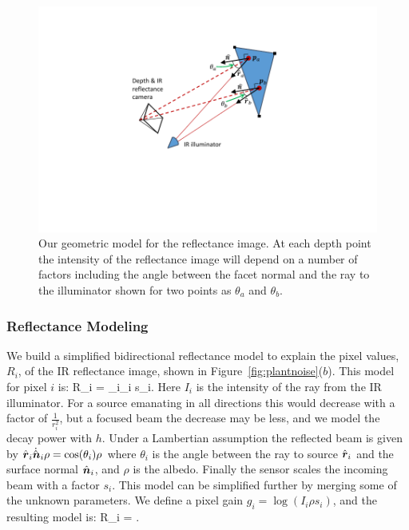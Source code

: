 \begin{figure}
\begin{center}
   \includegraphics[trim=100 100 100 40,clip,width=0.95\linewidth]{Figures/ShapeFromShading}
\end{center}
   \caption{Our geometric model for the reflectance image.  At each depth point the intensity of the reflectance image will depend on a number of factors including the angle between the facet normal and the ray to the illuminator shown for two points as $\theta_a$ and $\theta_b$. }
\label{fig:shapefromshading}
\end{figure}

\subsubsection{Reflectance Modeling}

We build a simplified bidirectional reflectance model to explain the pixel values, $R_i$, of the IR reflectance image, shown in Figure~\ref{fig:plantnoise}($b$).  This model for pixel $i$ is:
\beq
R_i = \ray_i\cdot\normal_i \rho s_i.\label{eq:reflectanceinit}
\eeq
Here $I_i$ is the intensity of the ray from the IR illuminator.  For a source emanating in all directions this would decrease with a factor of $\frac{1}{r_i^2}$, but a focused beam the decrease may be less, and we model the decay power with $h$.  Under a Lambertian assumption the reflected beam is given by $\hat{\boldsymbol{r}}_i\dot{\hat{\boldsymbol{n}}}_i \rho = \cos(\theta_i) \rho$ where $\theta_i$ is the angle between the ray to source $\hat{\boldsymbol{r}}_i$ and the surface normal $\hat{\boldsymbol{n}}_i$, and $\rho$ is the albedo.  Finally the sensor scales the incoming beam with a factor $s_i$.  This model can be simplified further by merging some of the unknown parameters.  We define a pixel gain $g_i = \log(I_i \rho s_i)$, and the resulting model is:
\beq
R_i = . \label{eq:reflectance}
\eeq

